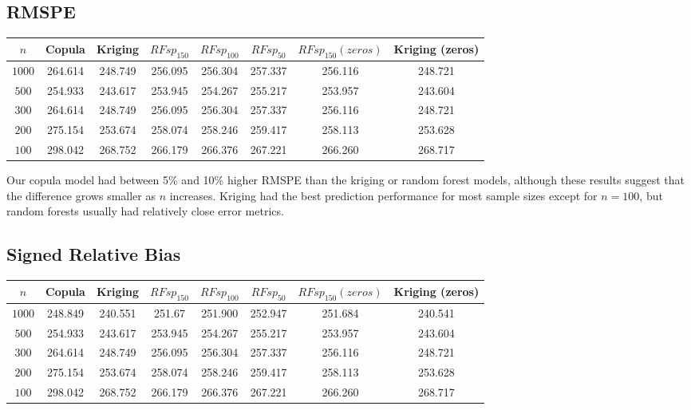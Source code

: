 \documentclass{article}
\begin{document}
\subsection{RMSPE}
\begin{center}
\begin{tabular}{|| c | c c c c c c c ||}
\hline
$n$ & Copula & Kriging & $RFsp_{150}$ & $RFsp_{100}$ & $RFsp_{50}$ & $RFsp_{150}(zeros)$ & Kriging (zeros) \\ [.5ex] 
\hline\hline
	$1000$ & 264.614 & 248.749 & 256.095 & 256.304 & 257.337 & 256.116 & 248.721 \\
	$500$ & 254.933 & 243.617 & 253.945 & 254.267 & 255.217 & 253.957 & 243.604 \\
	$300$ & 264.614 & 248.749 & 256.095 & 256.304 & 257.337 & 256.116 & 248.721 \\
	$200$ & 275.154 & 253.674 & 258.074 & 258.246 & 259.417 & 258.113 & 253.628 \\
	$100$ & 298.042 & 268.752 & 266.179 & 266.376 & 267.221 & 266.260 & 268.717 \\ [.5ex] 
\hline
\end{tabular}
\end{center}

Our copula model had between 5\% and 10\% higher RMSPE than the kriging or random forest models, although these results suggest that the difference grows smaller as $n$ increases.
Kriging had the best prediction performance for most sample sizes except for $n = 100$, but random forests usually had relatively close error metrics.

\subsection{Signed Relative Bias}
\begin{center}
\begin{tabular}{|| c | c c c c c c c ||}
\hline
$n$ & Copula & Kriging & $RFsp_{150}$ & $RFsp_{100}$ & $RFsp_{50}$ & $RFsp_{150}(zeros)$ & Kriging (zeros) \\ [.5ex] 
\hline\hline
	$1000$ & 248.849 & 240.551 & 251.67 & 251.900 & 252.947 & 251.684 & 240.541 \\
	$500$ & 254.933 & 243.617 & 253.945 & 254.267 & 255.217 & 253.957 & 243.604 \\
	$300$ & 264.614 & 248.749 & 256.095 & 256.304 & 257.337 & 256.116 & 248.721 \\
	$200$ & 275.154 & 253.674 & 258.074 & 258.246 & 259.417 & 258.113 & 253.628 \\
	$100$ & 298.042 & 268.752 & 266.179 & 266.376 & 267.221 & 266.260 & 268.717 \\ [.5ex] 
\hline
\end{tabular}
\end{center}
\end{document}
